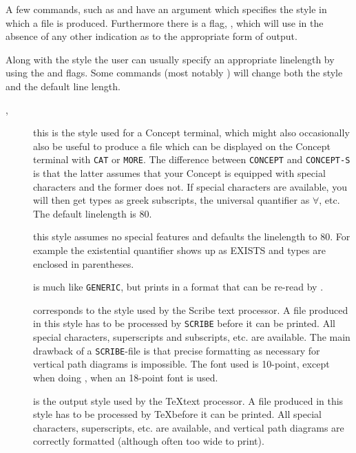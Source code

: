 A few commands, such as  and  
have an argument  which specifies
the style in which a file is produced. Furthermore there is a flag, ,
which \TPS will use in the absence of any other indication as to the 
appropriate form of output.

Along with the style the user can usually specify an appropriate linelength
by using the  and  flags.
Some commands (most notably ) will change 
both the style and the default line length.

\begin{description}
\item [,  ] this is the style used for a Concept terminal,
which might also
	occasionally also be useful to produce a file which can be
	displayed on the Concept terminal with {\tt CAT} or {\tt MORE}.
The difference between {\tt CONCEPT} and {\tt CONCEPT-S} is that the latter assumes 
that your Concept is equipped with special characters and the former does not.
If special characters are available,
	you will then get types as greek subscripts,
	the universal quantifier as $\forall$, etc.  The default linelength
	is 80.

\item [ ] this style assumes no special features and defaults the 
	linelength to 80.  For example the existential quantifier shows up as EXISTS
	and types are enclosed in parentheses.

\item [ ]  is much like {\tt GENERIC}, but prints in a format that 
can be re-read by \tps.

\item [ ] corresponds to the style used by the Scribe text processor.
	A file produced in this style has to be processed by {\tt SCRIBE}
	before it can be printed. All special characters,
	superscripts and subscripts, etc. are available. The main drawback
	of a {\tt SCRIBE}-file is that precise formatting as necessary
	for vertical path diagrams is impossible. The font used is 10-point, except 
        when doing , when an 18-point font is used.

\item [ ] is the output style used by the \TeX text processor.
A file produced in this style has to be processed by \TeX before it can be printed.
All special characters, superscripts, etc. are available, and vertical path diagrams
are correctly formatted (although often too wide to print). 


\end{description}
